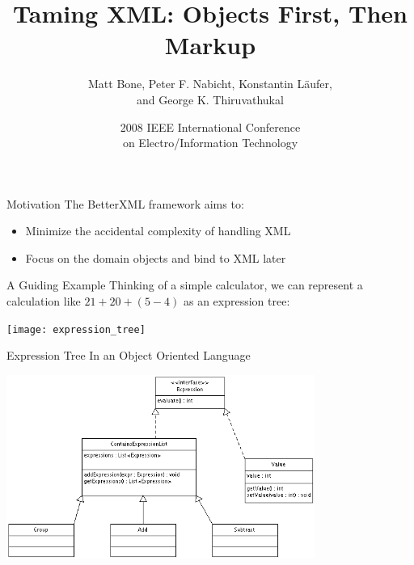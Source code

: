 \documentclass{beamer}
\title %
{Taming XML: Objects First, Then Markup}
\author[Bone, Nabicht, L\"{a}ufer, Thiruvathukal] %
{Matt Bone, Peter F. Nabicht, Konstantin L\"{a}ufer,\\and George K. Thiruvathukal}
\institute[Loyola University Chicago] %
{
  Emerging Technologies Laboratory\\
  Department of Computer Science \\
  Loyola University Chicago
}
\date[EIT 2008] %
{2008 IEEE International Conference\\on Electro/Information Technology}
\begin{document}
\begin{frame}
  \titlepage
\end{frame}






\begin{frame}{Motivation}
The BetterXML framework aims to:
\begin{itemize}
  \item Minimize the accidental complexity of handling XML 
  \item Focus on the domain objects and  bind to XML later
\end{itemize}
\end{frame}

\begin{frame}{A Guiding Example}
  Thinking of a simple calculator, we can represent a calculation like 
  $21+20+(5-4)$ as an expression tree:

  \begin{center}\texttt{[image: expression\_tree]}\end{center}
\end{frame}

\begin{frame}{Expression Tree In an Object Oriented Language}
  \begin{center}\includegraphics[height=6cm]{expr_tree_diagram}\end{center}
\end{frame}
\end{document}
